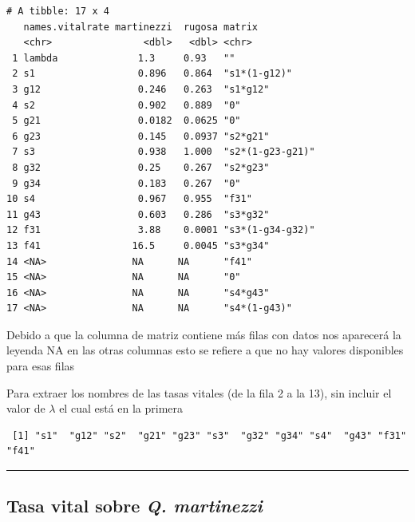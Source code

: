 \documentclass[
  12pt,
  letterpaper,
]{book}
\newenvironment{Shaded}{\begin{snugshade}}{\end{snugshade}}
\newcommand{\CommentTok}[1]{\textcolor[rgb]{0.37,0.37,0.37}{#1}}
\newcommand{\DecValTok}[1]{\textcolor[rgb]{0.68,0.00,0.00}{#1}}
\newcommand{\NormalTok}[1]{\textcolor[rgb]{0.00,0.23,0.31}{#1}}
\newcommand{\OtherTok}[1]{\textcolor[rgb]{0.00,0.23,0.31}{#1}}
\newcommand{\SpecialCharTok}[1]{\textcolor[rgb]{0.37,0.37,0.37}{#1}}
\begin{document}
\begin{verbatim}
# A tibble: 17 x 4
   names.vitalrate martinezzi  rugosa matrix          
   <chr>                <dbl>   <dbl> <chr>           
 1 lambda              1.3     0.93   ""              
 2 s1                  0.896   0.864  "s1*(1-g12)"    
 3 g12                 0.246   0.263  "s1*g12"        
 4 s2                  0.902   0.889  "0"             
 5 g21                 0.0182  0.0625 "0"             
 6 g23                 0.145   0.0937 "s2*g21"        
 7 s3                  0.938   1.000  "s2*(1-g23-g21)"
 8 g32                 0.25    0.267  "s2*g23"        
 9 g34                 0.183   0.267  "0"             
10 s4                  0.967   0.955  "f31"           
11 g43                 0.603   0.286  "s3*g32"        
12 f31                 3.88    0.0001 "s3*(1-g34-g32)"
13 f41                16.5     0.0045 "s3*g34"        
14 <NA>               NA      NA      "f41"           
15 <NA>               NA      NA      "0"             
16 <NA>               NA      NA      "s4*g43"        
17 <NA>               NA      NA      "s4*(1-g43)"    
\end{verbatim}

Debido a que la columna de matriz contiene más filas con datos nos
aparecerá la leyenda NA en las otras columnas esto se refiere a que no
hay valores disponibles para esas filas

Para extraer los nombres de las tasas vitales (de la fila 2 a la 13),
sin incluir el valor de \(\lambda\) el cual está en la primera

\begin{Shaded}
\end{Shaded}

\begin{verbatim}
 [1] "s1"  "g12" "s2"  "g21" "g23" "s3"  "g32" "g34" "s4"  "g43" "f31" "f41"
\end{verbatim}

\begin{center}\rule{0.5\linewidth}{0.5pt}\end{center}

\subsection{\texorpdfstring{Tasa vital sobre \emph{Q.
martinezzi}}{Tasa vital sobre Q. martinezzi}}\label{tasa-vital-sobre-q.-martinezzi}
\end{document}
